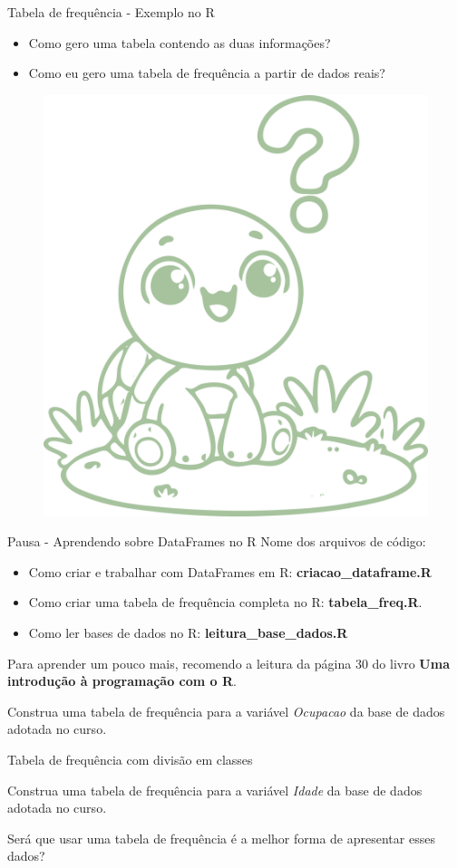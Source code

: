 \begin{frame}{Tabela de frequência - Exemplo no R}
    \begin{itemize}
        \item Como gero uma tabela contendo as duas informações?
        \item Como eu gero uma tabela de frequência a partir de dados reais?
    \end{itemize}
    \begin{figure}
        \centering
        \includegraphics[width=0.3\linewidth]{figures/turtle_doubt.png}
    \end{figure}
\end{frame}

\begin{frame}{Pausa - Aprendendo sobre DataFrames no R}
    Nome dos arquivos de código:
    
    \begin{itemize}
        \item Como criar e trabalhar com DataFrames em R: \textbf{criacao\_dataframe.R}
        \item Como criar uma tabela de frequência completa no R: \textbf{tabela\_freq.R}.
        \item Como ler bases de dados no R: \textbf{leitura\_base\_dados.R}
    \end{itemize}
    \pause
    Para aprender um pouco mais, recomendo a leitura da página 30 do livro \textbf{Uma introdução à programação com o R}.
\end{frame}
\begin{frame}
    \begin{exemplo}
        Construa uma tabela de frequência para a variável \textit{Ocupacao} da base de dados adotada no curso.
    \end{exemplo}
    
\end{frame}

\begin{frame}{Tabela de frequência com divisão em classes} 
   \begin{exemplo}
        Construa uma tabela de frequência para a variável \textit{Idade} da base de dados adotada no curso.
    \end{exemplo}
\pause
    Será que usar uma tabela de frequência é a melhor forma de apresentar esses dados?
\end{frame}

